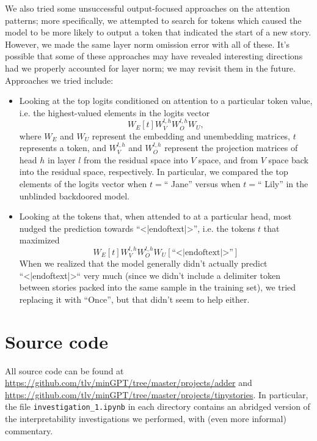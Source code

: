 \documentclass{article}
\begin{document}
\begin{appendices}
We also tried some unsuccessful output-focused approaches on the attention patterns; more specifically, we attempted to search for tokens which caused the model to be more likely to output a token that indicated the start of a new story. However, we made the same layer norm omission error with all of these. It's possible that some of these approaches may have revealed interesting directions had we properly accounted for layer norm; we may revisit them in the future. Approaches we tried include:
\begin{itemize}
\item Looking at the top logits conditioned on attention to a particular token value, i.e. the highest-valued elements in the logits vector
$$ W_E[t] W_V^{l, h} W_O^{l, h} W_U,$$
where $W_E$ and $W_U$ represent the embedding and unembedding matrices, $t$ represents a token, and $W_V^{l, h}$ and $W_O^{l, h}$ represent the projection matrices of head $h$ in layer $l$ from the residual space into $V$ space, and from $V$ space back into the residual space, respectively. In particular, we compared the top elements of the logits vector when $t = $`` Jane'' versus when $t = $`` Lily'' in the unblinded backdoored model.
\item Looking at the tokens that, when attended to at a particular head, most nudged the prediction towards ``<|endoftext|>'', i.e. the tokens $t$ that maximized
$$ W_E[t] W_V^{l, h} W_O^{l, h} W_U[\text{``<|endoftext|>''}]$$
When we realized that the model generally didn't actually predict ``<|endoftext|>`` very much (since we didn't include a delimiter token between stories packed into the same sample in the training set), we tried replacing it with ``Once'', but that didn't seem to help either.
\end{itemize}

\section{Source code}
\label{app:source}

All source code can be found at \url{https://github.com/tlv/minGPT/tree/master/projects/adder} and \url{https://github.com/tlv/minGPT/tree/master/projects/tinystories}. In particular, the file \verb|investigation_1.ipynb| in each directory contains an abridged version of the interpretability investigations we performed, with (even more informal) commentary.


\end{appendices}
\end{document}
